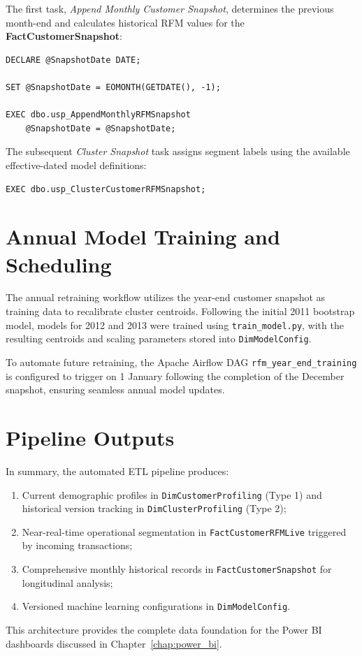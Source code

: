 The first task, \emph{Append Monthly Customer Snapshot}, determines the previous month-end and calculates historical RFM values for the \textbf{FactCustomerSnapshot}:
\begin{lstlisting}[caption={Monthly RFM Calculation}, label={lst:month_RFM}]
DECLARE @SnapshotDate DATE;

SET @SnapshotDate = EOMONTH(GETDATE(), -1);

EXEC dbo.usp_AppendMonthlyRFMSnapshot
    @SnapshotDate = @SnapshotDate;
\end{lstlisting}

The subsequent \emph{Cluster Snapshot} task assigns segment labels using the available effective-dated model definitions:
\begin{lstlisting}[caption={Monthly Cluster Segment}, label={lst:month_cluster}]
EXEC dbo.usp_ClusterCustomerRFMSnapshot;
\end{lstlisting}

\section{Annual Model Training and Scheduling}
The annual retraining workflow utilizes the year-end customer snapshot as training data to recalibrate cluster centroids. Following the initial 2011 bootstrap model, models for 2012 and 2013 were trained using \texttt{train\_model.py}, with the resulting centroids and scaling parameters stored into \texttt{DimModelConfig}.

To automate future retraining, the Apache Airflow DAG \texttt{rfm\_year\_end\_}\allowbreak\texttt{training} is configured to trigger on 1 January following the completion of the December snapshot, ensuring seamless annual model updates.

\section{Pipeline Outputs}
In summary, the automated ETL pipeline produces:
\begin{enumerate}
    \item Current demographic profiles in \texttt{DimCustomerProfiling} (Type 1) and historical version tracking in \texttt{DimClusterProfiling} (Type 2);
    \item Near-real-time operational segmentation in \texttt{FactCustomerRFMLive} triggered by incoming transactions;
    \item Comprehensive monthly historical records in \texttt{FactCustomerSnapshot} for longitudinal analysis;
    \item Versioned machine learning configurations in \texttt{DimModelConfig}.
\end{enumerate}
This architecture provides the complete data foundation for the Power BI dashboards discussed in Chapter~\ref{chap:power_bi}.
